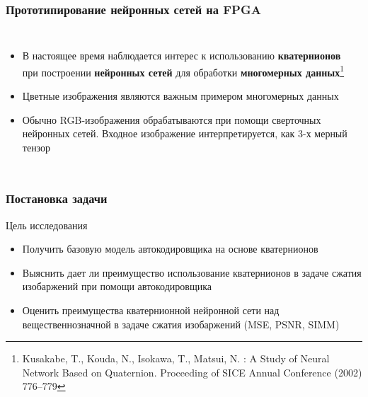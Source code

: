 \begin{frame}
\frametitle{Прототипирование нейронных сетей на FPGA}
\begin{columns}[T]

    \begin{itemize}
        \item В настоящее время наблюдается интерес к использованию \textbf{кватернионов} 
        при построении \textbf{нейронных сетей} для обработки \textbf{многомерных данных}\footnote{Kusakabe, T., Kouda, N., Isokawa, T., Matsui, N. : A Study of Neural Network Based on Quaternion. Proceeding of SICE Annual Conference (2002) 776–779}
        \item Цветные изображения являются важным примером многомерных данных
        \item Обычно RGB-изображения обрабатываются при помощи 
        сверточных нейронных сетей. Входное изображение 
        интерпретируется, как 3-х мерный тензор
    \end{itemize}

    \begin{block}{\centering}
        \vspace{1mm}
        \centering
                
    \end{block}
\end{columns}
\end{frame}

\begin{frame}
\frametitle{Постановка задачи}

\begin{block}{\centering Цель исследования}                
    \begin{itemize}\small
        \item Получить базовую модель автокодировщика на основе кватернионов
        \item Выяснить дает ли преимущество использование кватернионов
        в задаче сжатия изобаржений при помощи автокодировщика
        \item Оценить преимущества кватернионной нейронной сети над вещественнозначной
        в задаче сжатия изобаржений (MSE, PSNR, SIMM)            
    \end{itemize}
\end{block}
\end{frame}
